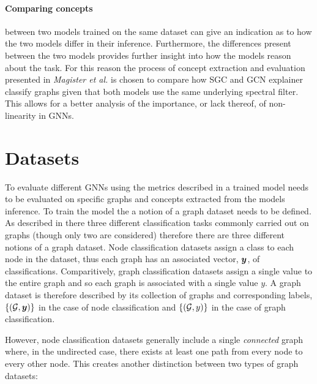 \paragraph{Comparing concepts} between two models trained on the same dataset can give an indication as to how the two models differ in their inference.
Furthermore, the differences present between the two models provides further insight into how the models reason about the task.
For this reason the process of concept extraction and evaluation presented in \textit{Magister et al.}\cite{magister2021gcexplainer} is chosen to compare how SGC and GCN explainer classify graphs given that both models use the same underlying spectral filter.
This allows for a better analysis of the importance, or lack thereof, of non-linearity in GNNs.  

\section{Datasets}


To evaluate different GNNs using the metrics described in  a trained model needs to be evaluated on specific graphs and concepts extracted from the models inference.
To train the model the a notion of a graph dataset needs to be defined.
As described in  there three different classification tasks commonly carried out on graphs (though only two are considered) therefore there are three different notions of a graph dataset.
Node classification datasets assign a class to each node in the dataset, thus each graph has an associated vector, ${\bm{y}}$, of classifications.
Comparitively, graph classification datasets assign a single value to the entire graph and so each graph is associated with a single value $y$.
A graph dataset is therefore described by its collection of graphs and corresponding labels, $\{({\mathcal{G}}, {\bm{y}})\}$ in the case of node classification and $\{({\mathcal{G}}, y)\}$ in the case of graph classification.

However, node classification datasets generally include a single \emph{connected} graph where, in the undirected case, there exists at least one path from every node to every other node.
This creates another distinction between two types of graph datasets:

